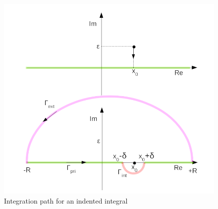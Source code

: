\documentclass[../template.tex]{subfiles}
\begin{document}
\begin{figure}[h!]
    \centering
    \includegraphics{image003.png}
    \caption{Integration path for an indented integral\label{fig:indented1}}
\end{figure}

 
\end{document}
